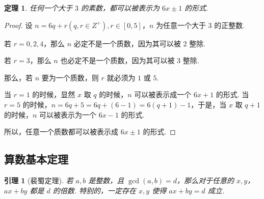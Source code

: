 \documentclass[a4paper]{article}
\newtheorem{theorem}{定理}[section]
\newtheorem{lemma}{引理}[section]
\begin{document}
\begin{theorem}
    任何一个大于 $3$ 的素数，都可以被表示为 $6x\pm 1$ 的形式.
\end{theorem}

\begin{proof}
    设 $n=6q+r(q,r\in Z^+),r \in [0,5]$，$n$ 为任意一个大于 $3$ 的正整数.

    若 $r=0,2,4$，那么 $n$ 必定不是一个质数，因为其可以被 $2$ 整除.

    若 $r=3$，那么 $n$ 也必定不是一个质数，因为其可以被 $3$ 整除.

    那么，若 $n$ 要为一个质数，则 $r$ 就必须为 $1$ 或 $5$.

    当 $r=1$ 的时候，显然 $x$ 取 $q$ 的时候，$n$ 可以被表示成一个 $6x+1$ 的形式. 当 $r=5$ 的时候，$n=6q+5=6q+
        (6-1)=6(q+1)-1$，于是，当 $x$ 取 $q+1$ 的时候，$n$ 可以被表示为一个 $6x-1$ 的形式.

    所以，任意一个质数都可以被表示成 $6x\pm 1$ 的形式.
\end{proof}

\subsection{算数基本定理}

\begin{lemma}[裴蜀定理]
    若 $a,b$ 是整数，且 $\gcd(a,b)=d$，那么对于任意的 $x,y$，$ax+by$ 都是 $d$ 的倍数. 特别的，一定存在 $x,y$
    使得 $ax+by=d$ 成立.
\end{lemma}
\end{document}
